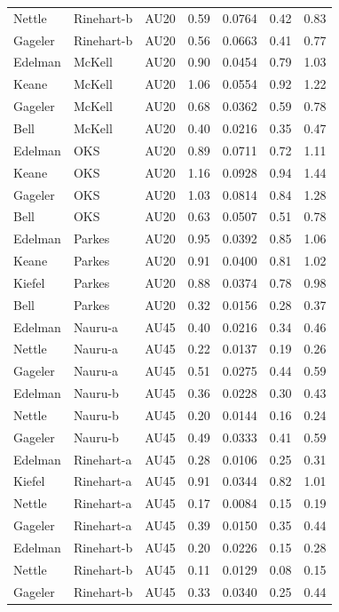 \documentclass{monashthesis}
\begin{document}
\begin{center}
\begin{longtable}{lllllll}
Nettle & Rinehart-b & AU20 & 0.59 & 0.0764 & 0.42 & 0.83 \\
Gageler & Rinehart-b & AU20 & 0.56 & 0.0663 & 0.41 & 0.77 \\
Edelman & McKell & AU20 & 0.90 & 0.0454 & 0.79 & 1.03 \\
Keane & McKell & AU20 & 1.06 & 0.0554 & 0.92 & 1.22 \\
Gageler & McKell & AU20 & 0.68 & 0.0362 & 0.59 & 0.78 \\
Bell & McKell & AU20 & 0.40 & 0.0216 & 0.35 & 0.47 \\
Edelman & OKS & AU20 & 0.89 & 0.0711 & 0.72 & 1.11 \\
Keane & OKS & AU20 & 1.16 & 0.0928 & 0.94 & 1.44 \\
Gageler & OKS & AU20 & 1.03 & 0.0814 & 0.84 & 1.28 \\
Bell & OKS & AU20 & 0.63 & 0.0507 & 0.51 & 0.78 \\
Edelman & Parkes & AU20 & 0.95 & 0.0392 & 0.85 & 1.06 \\
Keane & Parkes & AU20 & 0.91 & 0.0400 & 0.81 & 1.02 \\
Kiefel & Parkes & AU20 & 0.88 & 0.0374 & 0.78 & 0.98 \\
Bell & Parkes & AU20 & 0.32 & 0.0156 & 0.28 & 0.37 \\
Edelman & Nauru-a & AU45 & 0.40 & 0.0216 & 0.34 & 0.46 \\
Nettle & Nauru-a & AU45 & 0.22 & 0.0137 & 0.19 & 0.26 \\
Gageler & Nauru-a & AU45 & 0.51 & 0.0275 & 0.44 & 0.59 \\
Edelman & Nauru-b & AU45 & 0.36 & 0.0228 & 0.30 & 0.43 \\
Nettle & Nauru-b & AU45 & 0.20 & 0.0144 & 0.16 & 0.24 \\
Gageler & Nauru-b & AU45 & 0.49 & 0.0333 & 0.41 & 0.59 \\
Edelman & Rinehart-a & AU45 & 0.28 & 0.0106 & 0.25 & 0.31 \\
Kiefel & Rinehart-a & AU45 & 0.91 & 0.0344 & 0.82 & 1.01 \\
Nettle & Rinehart-a & AU45 & 0.17 & 0.0084 & 0.15 & 0.19 \\
Gageler & Rinehart-a & AU45 & 0.39 & 0.0150 & 0.35 & 0.44 \\
Edelman & Rinehart-b & AU45 & 0.20 & 0.0226 & 0.15 & 0.28 \\
Nettle & Rinehart-b & AU45 & 0.11 & 0.0129 & 0.08 & 0.15 \\
Gageler & Rinehart-b & AU45 & 0.33 & 0.0340 & 0.25 & 0.44 \\

\end{longtable}
\end{center}
\end{document}

